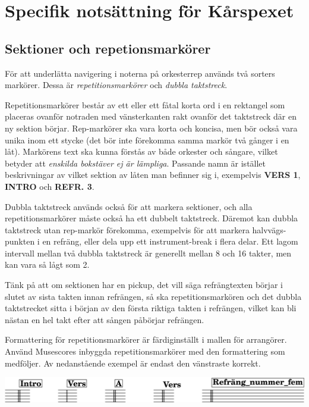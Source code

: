 \chapter{Specifik notsättning för Kårspexet}
\section{Sektioner och repetionsmarkörer}
För att underlätta navigering i noterna på orkesterrep används två sorters markörer. Dessa är \textit{repetitionsmarkörer} och \textit{dubbla taktstreck}. 

Repetitionsmarkörer består av ett eller ett fåtal korta ord i en rektangel som placeras ovanför notraden med vänsterkanten rakt ovanför det taktstreck där en ny sektion börjar. Rep-markörer ska vara korta och koncisa, men bör också vara unika inom ett stycke (det bör inte förekomma samma markör två gånger i en låt). Markörens text ska kunna förstås av både orkester och sångare, vilket betyder att \textit{enskilda bokstäver ej är lämpliga}. Passande namn är istället beskrivningar av vilket sektion av låten man befinner sig i, exempelvis \textbf{VERS 1}, \textbf{INTRO} och \textbf{REFR. 3}.

Dubbla taktstreck används också för att markera sektioner, och alla repetitionsmarkörer måste också ha ett dubbelt taktstreck. Däremot kan dubbla taktstreck utan rep-markör förekomma, exempelvis för att markera halvvägs-punkten i en refräng, eller dela upp ett instrument-break i flera delar. Ett lagom intervall mellan två dubbla taktstreck är generellt mellan 8 och 16 takter, men kan vara så lågt som 2.

Tänk på att om sektionen har en pickup, det vill säga refrängtexten börjar i slutet av sista takten innan refrängen, så ska repetitionsmarkören och det dubbla taktstrecket sitta i början av den första riktiga takten i refrängen, vilket kan bli nästan en hel takt efter att sången påbörjar refrängen.

Formattering för repetitionsmarkörer är färdiginställt i mallen för arrangörer. Använd Musescores inbyggda repetitionsmarkörer med den formattering som medföljer. Av nedanstående exempel är endast den vänstraste korrekt. 

\begin{center}
    \includegraphics{lilypond/repetition.cropped.png}
\end{center}

